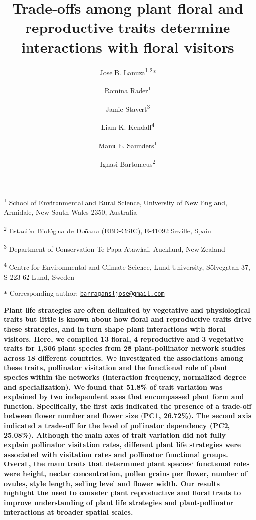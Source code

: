 \documentclass[12pt,a4paper,]{article}
\title{Trade-offs among plant floral and reproductive traits determine
interactions with floral visitors}
\author{Jose B. Lanuza\textsuperscript{1,2}* \and Romina Rader\textsuperscript{1} \and Jamie Stavert\textsuperscript{3} \and Liam K. Kendall\textsuperscript{4} \and Manu E. Saunders\textsuperscript{1} \and Ignasi Bartomeus\textsuperscript{2}}
\date{}
\begin{document}
\maketitle

\small
\doublespacing

\textsuperscript{1} School of Environmental and Rural Science,
University of New England, Armidale, New South Wales 2350, Australia

\textsuperscript{2} Estación Biológica de Doñana (EBD-CSIC), E-41092
Seville, Spain

\textsuperscript{3} Department of Conservation \textbar{} Te Papa
Atawhai, Auckland, New Zealand

\textsuperscript{4} Centre for Environmental and Climate Science, Lund
University, Sölvegatan 37, S-223 62 Lund, Sweden

\texttt{*} Corresponding author:
\href{mailto:barragansljose@gmail.com}{\nolinkurl{barragansljose@gmail.com}}

\normalsize
\singlespacing

\textbf{Plant life strategies are often delimited by vegetative and
physiological traits but little is known about how floral and
reproductive traits drive these strategies, and in turn shape plant
interactions with floral visitors. Here, we compiled 13 floral, 4
reproductive and 3 vegetative traits for 1,506 plant species from 28
plant-pollinator network studies across 18 different countries. We
investigated the associations among these traits, pollinator visitation
and the functional role of plant species within the networks
(interaction frequency, normalized degree and specialization). We found
that 51.8\% of trait variation was explained by two independent axes
that encompassed plant form and function. Specifically, the first axis
indicated the presence of a trade-off between flower number and flower
size (PC1, 26.72\%). The second axis indicated a trade-off for the level
of pollinator dependency (PC2, 25.08\%). Although the main axes of trait
variation did not fully explain pollinator visitation rates, different
plant life strategies were associated with visitation rates and
pollinator functional groups. Overall, the main traits that determined
plant species' functional roles were height, nectar concentration,
pollen grains per flower, number of ovules, style length, selfing level
and flower width. Our results highlight the need to consider plant
reproductive and floral traits to improve understanding of plant life
strategies and plant-pollinator interactions at broader spatial scales.}
\end{document}
